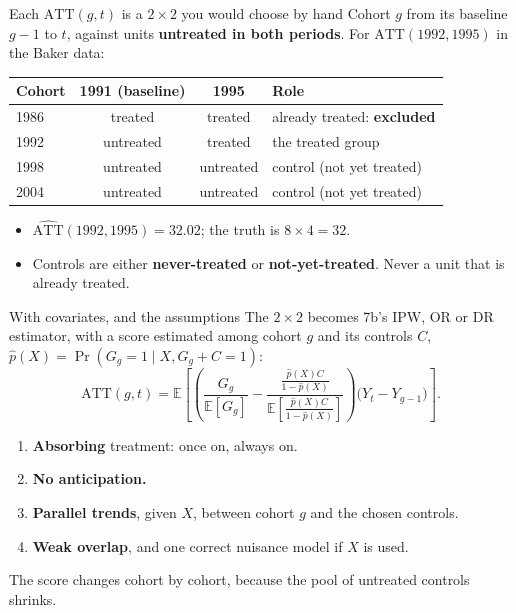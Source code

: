 \documentclass[
  11pt,
  ignorenonframetext,
  aspectratio=169,
]{beamer}
\providecommand{\tightlist}{%
  \setlength{\itemsep}{0pt}\setlength{\parskip}{0pt}}
\begin{document}
\begin{frame}{Each \(\text{ATT}(g,t)\) is a \(2 \times 2\) you would
choose by hand}
\protect{}\label{each-textattgt-is-a-2-times-2-you-would-choose-by-hand}
Cohort \(g\) from its baseline \(g - 1\) to \(t\), against units
\textbf{untreated in both periods}. For \(\text{ATT}(1992, 1995)\) in
the Baker data:

\begin{center}\small
\begin{tabular}{lccl}
\toprule
Cohort & 1991 (baseline) & 1995 & Role \\
\midrule
1986 & treated & treated & already treated: \textbf{excluded} \\
1992 & untreated & treated & the treated group \\
1998 & untreated & untreated & control (not yet treated) \\
2004 & untreated & untreated & control (not yet treated) \\
\bottomrule
\end{tabular}
\end{center}

\begin{itemize}
\tightlist
\item
  \(\widehat{\text{ATT}}(1992, 1995) = 32.02\); the truth is
  \(8 \times 4 = 32\).
\item
  Controls are either \textbf{never-treated} or
  \textbf{not-yet-treated}. Never a unit that is already treated.
\end{itemize}
\end{frame}

\begin{frame}{With covariates, and the assumptions}
\protect{}\label{with-covariates-and-the-assumptions}
The \(2 \times 2\) becomes 7b's IPW, OR or DR estimator, with a score
estimated among cohort \(g\) and its controls \(C\),
\(\hat p(X) = \Pr(G_g = 1 \mid X, G_g + C = 1)\): \[
\text{ATT}(g,t) = \mathbb{E}\!\left[\left(\frac{G_g}{\mathbb{E}[G_g]} - \frac{\frac{\hat p(X) C}{1 - \hat p(X)}}{\mathbb{E}\!\left[\frac{\hat p(X) C}{1 - \hat p(X)}\right]}\right)\big(Y_t - Y_{g-1}\big)\right].
\]

\begin{enumerate}
\tightlist
\item
  \textbf{Absorbing} treatment: once on, always on.
\item
  \textbf{No anticipation.}
\item
  \textbf{Parallel trends}, given \(X\), between cohort \(g\) and the
  chosen controls.
\item
  \textbf{Weak overlap}, and one correct nuisance model if \(X\) is
  used.
\end{enumerate}

The score changes cohort by cohort, because the pool of untreated
controls shrinks.
\end{frame}
\end{document}
